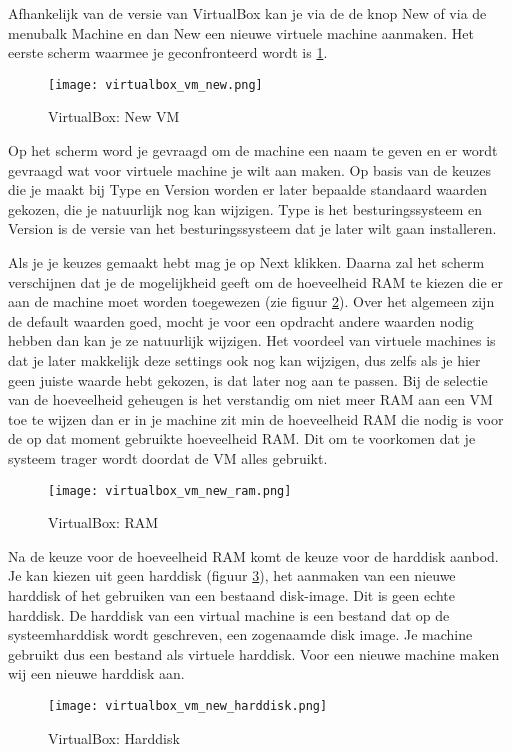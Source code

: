 Afhankelijk van de versie van VirtualBox kan je via de de knop New of via de menubalk Machine en dan New een nieuwe virtuele machine aanmaken. Het eerste scherm waarmee je geconfronteerd wordt is \ref{VB_New_VM}.
\begin{figure}[H]
	\centering
	\texttt{[image: virtualbox\_vm\_new.png]}
	\caption{VirtualBox: New VM}
	\label{VB_New_VM}
\end{figure}
Op het scherm word je gevraagd om de machine een naam te geven en er wordt gevraagd wat voor virtuele machine je wilt aan maken. Op basis van de keuzes die je maakt bij Type en Version worden er later bepaalde standaard waarden gekozen, die je natuurlijk nog kan wijzigen. Type is het besturingssysteem en Version is de versie van het besturingssysteem dat je later wilt gaan installeren.

Als je je keuzes gemaakt hebt mag je op Next klikken. Daarna zal het scherm verschijnen dat je de mogelijkheid geeft om de hoeveelheid RAM te kiezen die er aan de machine moet worden toegewezen (zie figuur \ref{VB_New_VM_RAM}). Over het algemeen zijn de default waarden goed, mocht je voor een opdracht andere waarden nodig hebben dan kan je ze natuurlijk wijzigen. Het voordeel van virtuele machines is dat je later makkelijk deze settings ook nog kan wijzigen, dus zelfs als je hier geen juiste waarde hebt gekozen, is dat later nog aan te passen. Bij de selectie van de hoeveelheid geheugen is het verstandig om niet meer RAM aan een VM toe te wijzen dan er in je machine zit min de hoeveelheid RAM die nodig is voor de op dat moment gebruikte hoeveelheid RAM. Dit om te voorkomen dat je systeem trager wordt doordat de VM alles gebruikt.

\begin{figure}[H]
	\centering
	\texttt{[image: virtualbox\_vm\_new\_ram.png]}
	\caption{VirtualBox: RAM}
	\label{VB_New_VM_RAM}
\end{figure}

Na de keuze voor de hoeveelheid RAM komt de keuze voor de harddisk aanbod. Je kan kiezen uit geen harddisk (figuur \ref{VB_New_VM_HD}), het aanmaken van een nieuwe harddisk of het gebruiken van een bestaand disk-image. Dit is geen echte harddisk. De harddisk van een virtual machine is een bestand dat op de systeemharddisk wordt geschreven, een zogenaamde disk image. Je machine gebruikt dus een bestand als virtuele harddisk. Voor een nieuwe machine maken wij een nieuwe harddisk aan.

\begin{figure}[H]
	\centering
	\texttt{[image: virtualbox\_vm\_new\_harddisk.png]}
	\caption{VirtualBox: Harddisk}
	\label{VB_New_VM_HD}
\end{figure}

